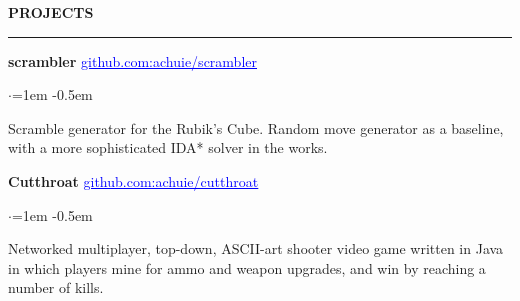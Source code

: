 \documentclass[10pt, a4paper]{article}
\newenvironment{aSection}[1]{
    \medskip \textbf{\uppercase{#1}}
    \smallskip
    \hrule
    \begin{list}{}{
            \setlength{\leftmargin}{1.5em}
        }
    \item[]
    }{
    \end{list}
}
\newenvironment{pSubsection}[2]{
    {#1} \hfill {#2}
    \smallskip
    \begin{list}{$\cdot$}{\leftmargin=1em}
    \itemsep -0.5em \vspace{-0.5em}
    }{
    \end{list}
    \vspace{0.5em}
}
\begin{document}
\begin{aSection}{Projects}
    \begin{pSubsection}
        {\textbf{scrambler}}
        {\href{https://www.github.com/achuie/scrambler}{\textcolor{blue}{\underline{github.com:achuie/scrambler}}}}
    \item[] Scramble generator for the Rubik's Cube. Random move
        generator as a baseline, with a more sophisticated IDA* solver in the
        works.
    \end{pSubsection}

    \begin{pSubsection}
        {\textbf{Cutthroat}}
        {\href{https://www.github.com/achuie/cutthroat}{\textcolor{blue}{\underline{github.com:achuie/cutthroat}}}}
    \item[] Networked multiplayer, top-down, ASCII-art shooter video game written in Java in which
        players mine for ammo and weapon upgrades, and win by reaching a number of kills.
    \end{pSubsection}
\end{aSection}
\end{document}
